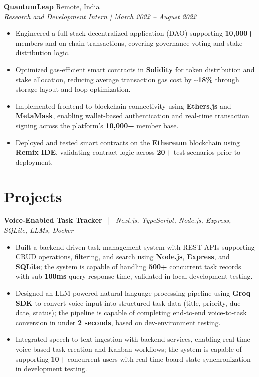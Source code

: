 \documentclass[8pt,a4paper]{extarticle}
\newcommand{\role}[2]{%
  \noindent\textbf{#1} \hfill #2\\[1pt]
}
\begin{document}
\role{QuantumLeap}{Remote, India}
\textit{Research and Development Intern | March 2022 -- August 2022}
\begin{itemize}
  \item Engineered a full-stack decentralized application (DAO) supporting \textbf{10,000+} members and on-chain transactions, covering governance voting and stake distribution logic.
  \item Optimized gas-efficient smart contracts in \textbf{Solidity} for token distribution and stake allocation, reducing average transaction gas cost by \textbf{\textasciitilde{}18\%} through storage layout and loop optimization.
  \item Implemented frontend-to-blockchain connectivity using \textbf{Ethers.js} and \textbf{MetaMask}, enabling wallet-based authentication and real-time transaction signing across the platform's \textbf{10,000+} member base.
  \item Deployed and tested smart contracts on the \textbf{Ethereum} blockchain using \textbf{Remix IDE}, validating contract logic across \textbf{20+} test scenarios prior to deployment.
\end{itemize}

\section*{Projects}
\textbf{Voice-Enabled Task Tracker} \ | \ \textit{Next.js, TypeScript, Node.js, Express, SQLite, LLMs, Docker}
\begin{itemize}
  \item Built a backend-driven task management system with REST APIs supporting CRUD operations, filtering, and search using \textbf{Node.js}, \textbf{Express}, and \textbf{SQLite}; the system is capable of handling \textbf{500+} concurrent task records with sub-\textbf{100ms} query response time, validated in local development testing.
  \item Designed an LLM-powered natural language processing pipeline using \textbf{Groq SDK} to convert voice input into structured task data (title, priority, due date, status); the pipeline is capable of completing end-to-end voice-to-task conversion in under \textbf{2 seconds}, based on dev-environment testing.
  \item Integrated speech-to-text ingestion with backend services, enabling real-time voice-based task creation and Kanban workflows; the system is capable of supporting \textbf{10+} concurrent users with real-time board state synchronization in development testing.
\end{itemize}
\end{document}
